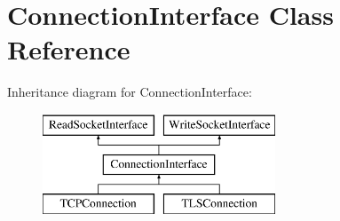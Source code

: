 \hypertarget{class_connection_interface}{}\section{Connection\+Interface Class Reference}
\label{class_connection_interface}
Inheritance diagram for Connection\+Interface\+:\begin{figure}[H]
\begin{center}
\leavevmode
\includegraphics[height=3.000000cm]{class_connection_interface}
\end{center}
\end{figure}
